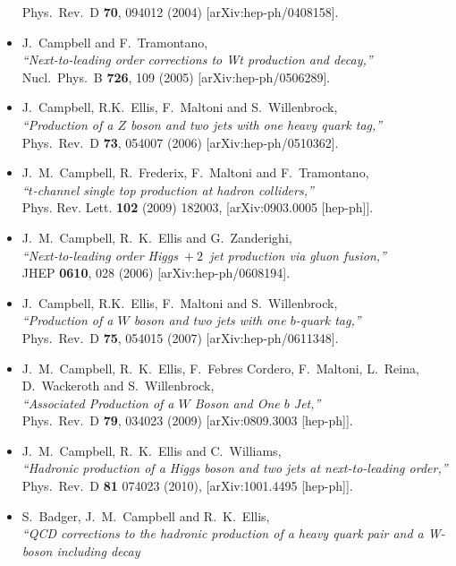 \begin{itemize}
  Phys.\ Rev.\ D {\bf 70}, 094012 (2004)
  [arXiv:hep-ph/0408158].
\item J.~Campbell and F.~Tramontano, \\
  {\it ``Next-to-leading order corrections to Wt production and
  decay,''} \\
  Nucl.\ Phys.\ B {\bf 726}, 109 (2005)
  [arXiv:hep-ph/0506289].
\item J.~Campbell, R.K.~Ellis, F.~Maltoni and S.~Willenbrock, \\
  {\it ``Production of a $Z$ boson and two jets with one heavy quark tag,''} \\
  Phys.\ Rev.\ D {\bf 73}, 054007 (2006)
  [arXiv:hep-ph/0510362].
\item J.~M.~Campbell, R.~Frederix, F.~Maltoni and F.~Tramontano,\\
  {\it ``$t$-channel single top production at hadron colliders,''} \\ 
  Phys. Rev. Lett. {\bf 102} (2009) 182003,
  [arXiv:0903.0005 [hep-ph]].
\item J.~M.~Campbell, R.~K.~Ellis and G.~Zanderighi, \\
  {\it ``Next-to-leading order Higgs~$+~2$~jet production via gluon fusion,''} \\
  JHEP {\bf 0610}, 028 (2006)
  [arXiv:hep-ph/0608194].
\item J.~Campbell, R.K.~Ellis, F.~Maltoni and S.~Willenbrock, \\
  {\it ``Production of a $W$ boson and two jets with one $b$-quark
  tag,''} \\
  Phys.\ Rev.\ D {\bf 75}, 054015 (2007)
  [arXiv:hep-ph/0611348].
\item J.~M.~Campbell, R.~K.~Ellis, F.~Febres Cordero, F.~Maltoni, L.~Reina, D.~Wackeroth and S.~Willenbrock, \\
  {\it ``Associated Production of a $W$ Boson and One $b$ Jet,''} \\
  Phys.\ Rev.\  D {\bf 79}, 034023 (2009)
  [arXiv:0809.3003 [hep-ph]].
\item J.~M.~Campbell, R.~K.~Ellis and C.~Williams, \\
  {\it ``Hadronic production of a Higgs boson and two jets at next-to-leading order,''} \\
   Phys.\ Rev.\ D {\bf 81} 074023 (2010),
  [arXiv:1001.4495 [hep-ph]].
\item S.~Badger, J.~M.~Campbell and R.~K.~Ellis, \\
  {\it ``QCD corrections to the hadronic production of a heavy quark pair and a  W-boson including decay 
}
\end{itemize}
